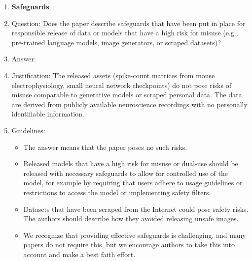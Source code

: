 \begin{enumerate}
\item {\bf Safeguards}
    \item[] Question: Does the paper describe safeguards that have been put in place for responsible release of data or models that have a high risk for misuse (e.g., pre-trained language models, image generators, or scraped datasets)?
    \item[] Answer: \answerNA{}
    \item[] Justification: The released assets (spike-count matrices
      from mouse electrophysiology, small neural network checkpoints)
      do not pose risks of misuse comparable to generative models
      or scraped personal data.  The data are derived from publicly
      available neuroscience recordings with no personally
      identifiable information.
    \item[] Guidelines:
    \begin{itemize}
        \item The answer \answerNA{} means that the paper poses no such risks.
        \item Released models that have a high risk for misuse or dual-use should be released with necessary safeguards to allow for controlled use of the model, for example by requiring that users adhere to usage guidelines or restrictions to access the model or implementing safety filters. 
        \item Datasets that have been scraped from the Internet could pose safety risks. The authors should describe how they avoided releasing unsafe images.
        \item We recognize that providing effective safeguards is challenging, and many papers do not require this, but we encourage authors to take this into account and make a best faith effort.
    \end{itemize}


\end{enumerate}
